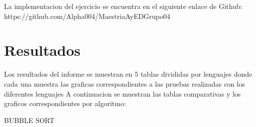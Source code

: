 \documentclass[12pt]{article} %
\begin{document}
La implementacion del ejercicio se encuentra en el siguiente enlace de Github: https://github.com/Alpha004/MaestriaAyEDGrupo04
\section{Resultados}

Los resultados del informe se muestran en 5 tablas divididas por lenguajes donde cada una muestra las graficas correspondientes a las pruebas realizadas con los diferentes lenguajes
A continuacion se muestran las tablas comparativas y los graficos correspondientes por algoritmo:

\vspace{5cm}

BUBBLE SORT

\vspace{5mm}
\end{document}

